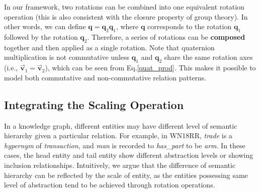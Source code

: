 \documentclass[11pt]{article}
\begin{document}
In our framework, two rotations can be combined into one equivalent rotation operation (this is also consistent with the closure property of group theory). In other words, we can define \(\textbf{q} = \textbf{q}_2\textbf{q}_1\), where \(\textbf{q}\) corresponds to the rotation \(\textbf{q}_1\) followed by the rotation \(\textbf{q}_2\). Therefore, a series of rotations can be \textbf{composed} together and then applied as a single rotation. Note that quaternion multiplication is not commutative unless \(\textbf{q}_1\) and \(\textbf{q}_2\) share the same rotation axes (i.e., \(\overrightarrow{\boldsymbol{v}}_1 = \overrightarrow{\boldsymbol{v}}_2\)), which can be seen from Eq.\ref{quat_prod}. This makes it possible to model both commutative and non-commutative relation patterns. 

\subsection{Integrating the Scaling Operation}

In a knowledge graph, different entities may have different level of semantic hierarchy given a particular relation. For example, in WN18RR, \textit{trade} is a \textit{hypernym} of \textit{transaction}, and \textit{man} is recorded to \textit{has\_part} to be \textit{arm}. In these cases, the head entity and tail entity show different abstraction levels or showing inclusion relationships. Intuitively, we argue that the difference of semantic hierarchy can be reflected by the scale of entity, as the entities possessing same level of abstraction tend to be achieved through rotation operations.
\end{document}
